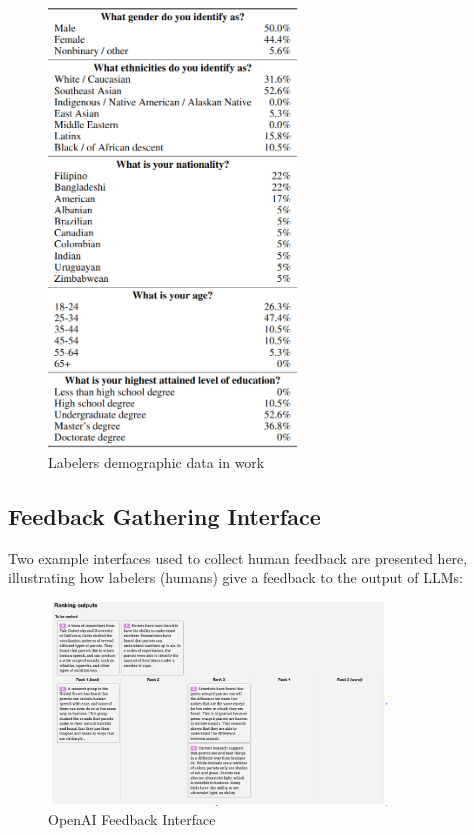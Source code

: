\begin{figure}[h]
    \centering
    \includegraphics[width=0.6\textwidth]{./figures/demography1.png}
    \caption{Labelers demographic data in \cite{ouyangTrainingLanguageModels2022} work}
    \label{fig:demograph}
\end{figure}

\subsection{Feedback Gathering Interface} \label{subsec:feedback-interface}


Two example interfaces used to collect human feedback are presented here, illustrating how labelers (humans) give a feedback to the output of LLMs:\\




\begin{figure}[h]
    \centering
    \includegraphics[width=0.8\textwidth]{./figures/image_interface_openai.png}
    \caption{OpenAI Feedback Interface}
    \label{fig:interface-openai}
\end{figure}

